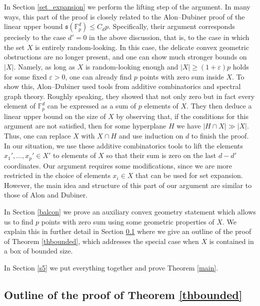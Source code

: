 \documentclass{daj}
\renewcommand{\le}{\leqslant}
\renewcommand{\ge}{\geqslant}
\newcommand{\s}{\mathfrak s}
\newcommand{\FF}{\mathbb F}
\theoremstyle{definition}
\theoremstyle{remark}
\theoremstyle{definition}
\theoremstyle{definition}
\begin{document}
In Section \ref{set_expansion} we perform the lifting step of the argument. In many ways, this part of the proof is closely related to the Alon--Dubiner \cite{AD} proof of the linear upper bound $\s(\FF_p^d) \le C_d p$. Specifically, their argument corresponds precisely to the case $d' = 0$ in the above discussion, that is, to the case in which the set $X$ is entirely random-looking.
In this case, the delicate convex geometric obstructions are no longer present, and one can show much stronger bounds on $|X|$. Namely, as long as $X$ is random-looking enough and $|X| \ge (1+\varepsilon)p$ holds for some fixed $\varepsilon >0$, one can already find $p$ points with zero sum inside $X$. To show this, Alon--Dubiner \cite{AD} used tools from additive combinatorics and spectral graph theory. Roughly speaking, they showed that not only zero but in fact every element of $\FF_p^d$ can be expressed as a sum of $p$ elements of $X$.
They then deduce a linear upper bound on the size of $X$ by observing that, if the conditions for this argument are not satisfied, then for some hyperplane $H$ we have $|H\cap X| \gg |X|$. Thus, one can replace $X$ with $X \cap H$ and use induction on $d$ to finish the proof. In our situation, we use these additive combinatorics tools to lift the elements $x_1', \ldots, x_p' \in X'$ to elements of $X$ so that their sum is zero on the last $d-d'$ coordinates. Our argument requires some modifications, since we are more restricted in the choice of elements $x_i \in X$ that can be used for set expansion. However, the main idea and structure of this part of our argument are similar to those of Alon and Dubiner.

In Section \ref{balcon} we prove an auxiliary convex geometry statement which allows us to find $p$ points with zero sum using some geometric properties of $X$. We explain this in further detail in Section \ref{over} where we give an outline of the proof of Theorem \ref{thbounded}, which addresses the special case when $X$ is contained in a box of bounded size.

In Section \ref{s5} we put everything together and prove Theorem \ref{main}. 


\subsection{Outline of the proof of Theorem \ref{thbounded}}\label{over}
\end{document}
